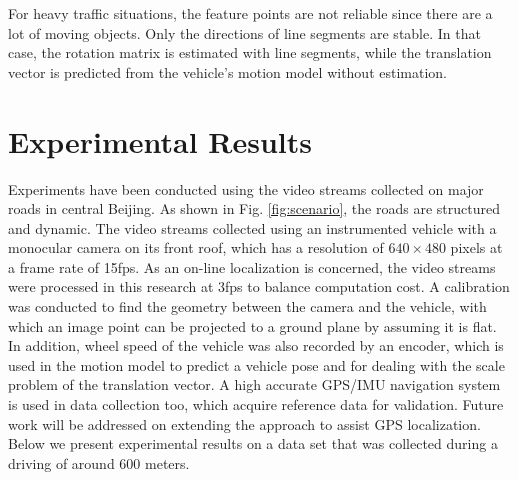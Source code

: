 \documentclass[letterpaper, 10 pt, conference]{ieeeconf}  %
\begin{document}

For heavy traffic situations, the feature points are not reliable since there are a lot of moving objects. Only the directions of line segments are stable. In that case, the rotation matrix is estimated with line segments, while the translation vector is predicted from the vehicle's motion model without estimation.


\section{Experimental Results}
\label{sec_experiments}
Experiments have been conducted using the video streams collected on major roads in central Beijing. As shown in Fig. \ref{fig:scenario}, the roads are structured and dynamic. The video streams collected using an instrumented vehicle with a monocular camera on its front roof, which has a resolution of $640\times480$ pixels at a frame rate of 15fps. As an on-line localization is concerned, the video streams were processed in this research at 3fps to balance computation cost. A calibration was conducted to find the geometry between the camera and the vehicle, with which an image point can be projected to a ground plane by assuming it is flat. In addition, wheel speed of the vehicle was also recorded by an encoder, which is used in the motion model to predict a vehicle pose and for dealing with the scale problem of the translation vector. A high accurate GPS/IMU navigation system is used in data collection too, which acquire reference data for validation. Future work will be addressed on extending the approach to assist GPS localization. Below we present experimental results on a data set that was collected during a driving of around 600 meters.
\end{document}
